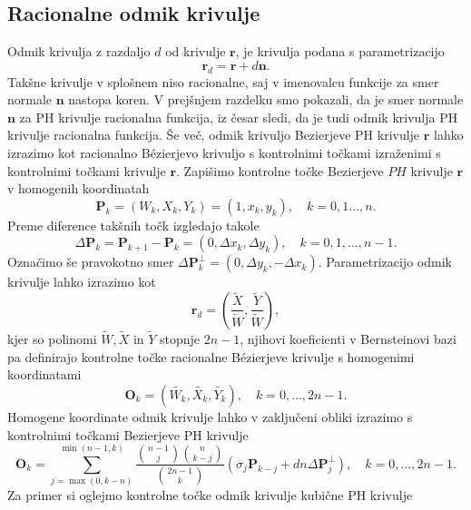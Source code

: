 \documentclass[isrm2, tisk]{fmfdelo}
\newcommand{\mycomment}[1]{\textbf{\textcolor{red}{#1}}}
\begin{document}
    \subsection{Racionalne odmik krivulje}
    Odmik krivulja z razdaljo $d$ od krivulje $\mathbf{r}$, je krivulja podana s parametrizacijo \[\mathbf{r}_d=\mathbf{r} + d\mathbf{n}.\]
    Takšne krivulje v splošnem niso racionalne, saj v imenovalcu funkcije za smer normale $\mathbf{n}$ nastopa koren.
    V prejšnjem razdelku smo pokazali, da je smer normale $\mathbf{n}$ za PH krivulje racionalna funkcija, iz česar sledi, da je tudi odmik krivulja PH krivulje racionalna funkcija.
    Še več, odmik krivuljo Bezierjeve PH krivulje $\mathbf{r}$ lahko izrazimo kot racionalno Bézierjevo krivuljo s kontrolnimi točkami izraženimi s kontrolnimi točkami krivulje $\mathbf{r}$.
    Zapišimo kontrolne točke Bezierjeve $PH$ krivulje $\mathbf{r}$ v homogenih koordinatah
    \[\mathbf{P}_k = (W_k,X_k,Y_k) = (1,x_k,y_k), \quad k=0,1\ldots,n. \]
    Preme diference takšnih točk izgledajo takole
    \[\Delta\mathbf{P}_k = \mathbf{P}_{k+1}-\mathbf{P}_k = (0,\Delta x_k,\Delta y_k), \quad k=0,1,\ldots,n-1.\]
    Označimo še pravokotno smer $\Delta\mathbf{P}_k^{\perp} =  (0,\Delta y_k, -\Delta x_k)$.
    Parametrizacijo odmik krivulje lahko izrazimo kot
    \[\mathbf{r}_d=\left(\frac{\tilde{X}}{\tilde{W}}, \frac{\tilde{Y}}{\tilde{W}}\right),\]
    kjer so polinomi $\tilde{W},\tilde{X}$ in $\tilde{Y}$ stopnje $2n-1$,
    njihovi koeficienti v Bernsteinovi bazi pa definirajo kontrolne točke racionalne Bézierjeve krivulje s homogenimi koordinatami
    \[\mathbf{O}_k=(\tilde{W_k},\tilde{X_k},\tilde{Y_k}),\quad k=0,\ldots,2n-1.\]
    Homogene koordinate odmik krivulje lahko v zaključeni obliki izrazimo s kontrolnimi točkami Bezierjeve PH krivulje
    \[\mathbf{O}_k= \sum_{j=\max(0,k-n)}^{\min(n-1,k)} \frac{\binom{n-1}{j}\binom{n}{k-j} }{\binom{2n-1}{k}}(\sigma_j\mathbf{P}_{k-j} + dn\Delta \mathbf{P}_j^{\perp}),\quad k=0,\ldots,2n-1.        \]
    Za primer si oglejmo kontrolne točke odmik krivulje kubične PH krivulje
\end{document}
